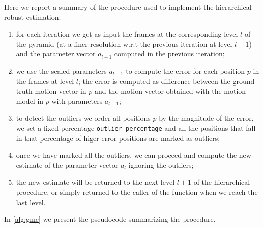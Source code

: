 Here we report a summary of the procedure used to implement the hierarchical robust estimation:
\begin{enumerate}
    \item for each iteration we get as input the frames at the corresponding level $l$ of the pyramid (at a finer resolution w.r.t the previous iteration at level $l-1$) and the parameter vector $a_{l-1}$ computed in the previous iteration;
    \item we use the scaled parameters $a_{l-1}$ to compute the error for each position $p$ in the frames at level $l$; the error is computed as difference between the ground truth motion vector in $p$ and the motion vector obtained with the motion model in $p$ with parameters $a_{l-1}$;
    \item to detect the outliers we order all positions $p$ by the magnitude of the error, we set a fixed percentage \texttt{outlier\_percentage} and all the positions that fall in that percentage of higer-error-positions are marked as outliers;
    \item once we have marked all the outliers, we can proceed and compute the new estimate of the parameter vector $a_{l}$ ignoring the outliers;
    \item the new estimate will be returned to the next level $l+1$ of the hierarchical procedure, or simply returned to the caller of the function when we reach the last level.
\end{enumerate}

In \cref{alg:gme} we present the pseudocode summarizing the procedure.
